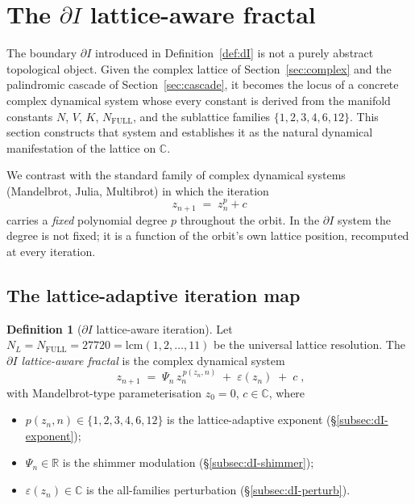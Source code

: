 \documentclass[11pt,a4paper]{article}
\theoremstyle{definition}
\newtheorem{definition}[theorem]{Definition}
\theoremstyle{remark}
\newcommand{\R}{\mathbb{R}}
\newcommand{\C}{\mathbb{C}}
\begin{document}
\section{The $\partial I$ lattice-aware fractal}\label{sec:fractal}

The boundary $\partial I$ introduced in Definition~\ref{def:dI} is not a purely abstract topological object. Given the complex lattice of Section~\ref{sec:complex} and the palindromic cascade of Section~\ref{sec:cascade}, it becomes the locus of a concrete complex dynamical system whose every constant is derived from the manifold constants $N$, $V$, $K$, $N_{\mathrm{FULL}}$, and the sublattice families $\{1,2,3,4,6,12\}$. This section constructs that system and establishes it as the natural dynamical manifestation of the lattice on $\C$.

We contrast with the standard family of complex dynamical systems (Mandelbrot, Julia, Multibrot) in which the iteration
\[
z_{n+1} \;=\; z_{n}^{p} + c
\]
carries a \emph{fixed} polynomial degree $p$ throughout the orbit. In the $\partial I$ system the degree is not fixed; it is a function of the orbit's own lattice position, recomputed at every iteration.

\subsection{The lattice-adaptive iteration map}

\begin{definition}[$\partial I$ lattice-aware iteration]\label{def:dI-iteration}
Let $N_{L}=N_{\mathrm{FULL}}=27720=\mathrm{lcm}(1,2,\ldots,11)$ be the universal lattice resolution. The \emph{$\partial I$ lattice-aware fractal} is the complex dynamical system
\[
\boxed{\;z_{n+1} \;=\; \Psi_{n}\, z_{n}^{\,p(z_{n},n)} \;+\; \varepsilon(z_{n}) \;+\; c\;,}
\]
with Mandelbrot-type parameterisation $z_{0}=0$, $c\in\C$, where
\begin{itemize}[leftmargin=*]
\item $p(z_{n},n)\in\{1,2,3,4,6,12\}$ is the lattice-adaptive exponent (\S\ref{subsec:dI-exponent});
\item $\Psi_{n}\in\R$ is the shimmer modulation (\S\ref{subsec:dI-shimmer});
\item $\varepsilon(z_{n})\in\C$ is the all-families perturbation (\S\ref{subsec:dI-perturb}).
\end{itemize}
\end{definition}
\end{document}
